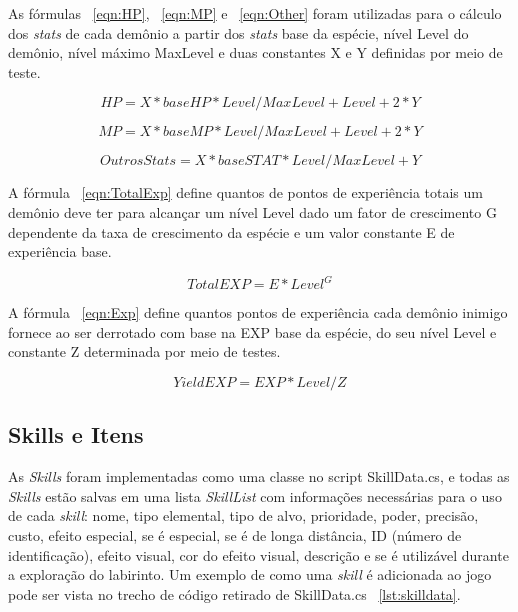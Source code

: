 \documentclass[
	12pt,				%
	openright,			%
	twoside,			%
	a4paper,			%
	english,			%
	french,				%
	spanish,			%
	brazil				%
	]{abntex2}
\begin{document}
	As fórmulas ~\ref{eqn:HP}, ~\ref{eqn:MP} e ~\ref{eqn:Other} foram  utilizadas para o cálculo dos \emph{stats} de cada demônio a partir dos \emph{stats} base da espécie, nível Level do demônio, nível máximo MaxLevel e duas constantes X e Y definidas por meio de teste.
	
\begin{equation}
\label{eqn:HP}
HP = X*baseHP * Level/MaxLevel + Level + 2*Y
\end{equation}

\begin{equation}
\label{eqn:MP}
MP = X*baseMP * Level/MaxLevel + Level + 2*Y
\end{equation}

\begin{equation}
\label{eqn:Other}
OutrosStats = X*baseSTAT * Level/MaxLevel + Y
\end{equation}

	A fórmula ~\ref{eqn:TotalExp} define quantos de pontos de experiência totais um demônio deve ter para alcançar um nível Level dado um fator de crescimento G dependente da taxa de crescimento da espécie e um valor constante E de experiência base.
	
\begin{equation}
\label{eqn:TotalExp}
TotalEXP = E * Level^G
\end{equation}

	A fórmula ~\ref{eqn:Exp} define quantos pontos de experiência cada demônio inimigo fornece ao ser derrotado com base na EXP base da espécie, do seu nível Level e constante Z determinada por meio de testes.
	
\begin{equation}
\label{eqn:Exp}
YieldEXP = EXP * Level/Z
\end{equation}


\subsection{Skills e Itens}

	As \emph{Skills} foram implementadas como uma classe no script SkillData.cs, e todas as \emph{Skills} estão salvas em uma lista \emph{SkillList} com informações necessárias para o uso de cada \emph{skill}: nome, tipo elemental, tipo de alvo, prioridade, poder, precisão, custo, efeito especial, se é especial, se é de longa distância, ID (número de identificação),  efeito visual, cor do efeito visual, descrição e se é utilizável durante a exploração do labirinto. Um exemplo de como uma \emph{skill} é adicionada ao jogo pode ser vista no trecho de código retirado de SkillData.cs ~\ref{lst:skilldata}.
\end{document}
